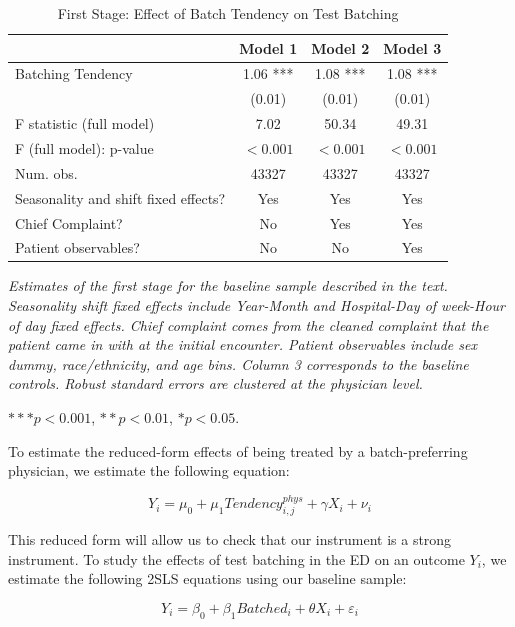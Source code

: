 \documentclass[,,nonblindrev]{informs}
\begin{document}
\begin{table}[ht]
\centering
\caption{First Stage: Effect of Batch Tendency on Test Batching}
\label{tab:regression}
\begin{tabular}{p{9cm}ccc}
\toprule
\textbf{} & Model 1 & Model 2 & Model 3 \\
\midrule
Batching Tendency & 1.06 *** & 1.08 *** & 1.08 *** \\
 & (0.01) & (0.01) & (0.01) \\
\midrule
F statistic (full model) & 7.02 & 50.34 & 49.31  \\  
F (full model): p-value & $<0.001$ & $<0.001$ & $<0.001$ \\
\midrule
Num. obs. & 43327 & 43327 & 43327 \\
Seasonality and shift fixed effects? & Yes & Yes & Yes \\
Chief Complaint? & No & Yes & Yes \\
Patient observables? & No & No & Yes \\
\bottomrule
\end{tabular}
\begin{tablenotes}
\tiny
\item \textit{Estimates of the first stage for the baseline sample described in the text. Seasonality shift fixed effects include Year-Month and Hospital-Day of week-Hour of day fixed effects. Chief complaint comes from the cleaned complaint that the patient came in with at the initial encounter. Patient observables include sex dummy, race/ethnicity, and age bins. Column 3 corresponds to the baseline controls. Robust standard errors are clustered at the physician level.}
\item $*** p < 0.001$, $** p < 0.01$, $* p < 0.05$.
\end{tablenotes}
\end{table}

To estimate the reduced-form effects of being treated by a
batch-preferring physician, we estimate the following equation:

\begin{equation}
Y_i = \mu_0 + \mu_1 Tendency_{i,j}^{phys} + \gamma X_i + \nu_i
\end{equation}

This reduced form will allow us to check that our instrument is a strong
instrument. To study the effects of test batching in the ED on an
outcome \(Y_i\), we estimate the following 2SLS equations using our
baseline sample:

\begin{equation}
Y_i = \beta_0 + \beta_1 Batched_i + \theta X_i + \varepsilon_i
\end{equation}
\end{document}
